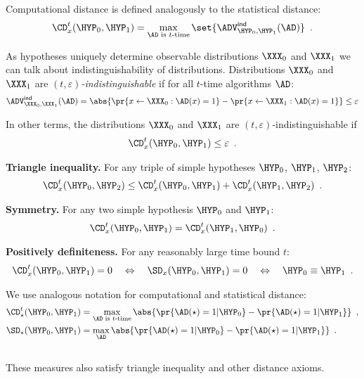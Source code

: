 \documentclass[landscape,footrule]{foils}
\begin{document}
Computational distance is defined analogously to the statistical distance:
\begin{align*}
  \CD_x^t(\HYP_0,\HYP_1)=\max_{\AD \text{ is $t$-time}} \set{\smash{\advINDXX{\HYP_0,\HYP_1}{\AD}}}
  \enspace.
\end{align*}

As hypotheses uniquely determine observable distributions $\XXX_0$ and
$\XXX_1$ we can talk about indistinguishability of distributions.
Distributions $\XXX_0$ and $\XXX_1$ are
$(t,\varepsilon)$\emph{-indistinguishable} if for all $t$-time
algorithms $\AD$:
\begin{align*}
  \advINDXX{\XXX_0,\XXX_1}{\AD}=
  \abs{\pr{x\gets \XXX_0: \AD(x)=1}-\pr{x\gets \XXX_1: \AD(x)=1}}\leq\varepsilon
\end{align*}

In other terms, the distributions $\XXX_0$ and $\XXX_1$ are
$(t,\varepsilon)$-indistinguishable if 
\begin{align*}
\CD_x^t(\HYP_0,\HYP_1)\leq \varepsilon\enspace.  
\end{align*}


\textbf{Triangle inequality.}  For any triple of simple hypotheses
$\HYP_0$, $\HYP_1$, $\HYP_2$:
\begin{align*}
    \CD_x^t(\HYP_0,\HYP_2)\leq \CD_x^t(\HYP_0,\HYP_1) +
    \CD_x^t(\HYP_1,\HYP_2) \enspace.
\end{align*}
\bigskip

\textbf{Symmetry.} For any two simple hypothesis $\HYP_0$ and $\HYP_1$:
  \begin{align*}
      \CD_x^t(\HYP_0,\HYP_1)=\CD_x^t(\HYP_1,\HYP_0)\enspace.
  \end{align*}
\bigskip

\textbf{Positively definiteness.} For any reasonably large time bound $t$:
  \begin{align*}
       \CD_x^t(\HYP_0,\HYP_1)=0\quad\Leftrightarrow\quad \SD_x(\HYP_0,\HYP_1)=0
       \quad\Leftrightarrow\quad \HYP_0\equiv\HYP_1\enspace.
  \end{align*}



\enlargethispage{2cm}

%
We use analogous notation for computational and statistical distance:\vspace*{-1.5ex}
\begin{align*}
  \CD_\star^t(\HYP_0,\HYP_1)%
  &=\max_{\AD \text{ is
      $t$-time}}\abs{\pr{\AD(\star)=1|\HYP_0}-\pr{\AD(\star)=1|\HYP_1}}\enspace,\\
  \SD_\star(\HYP_0,\HYP_1)%
  &=\max_{\AD}\abs{\pr{\AD(\star)=1|\HYP_0}-\pr{\AD(\star)=1|\HYP_1}}\enspace.
\end{align*}\vspace*{-3.5ex}\\
These measures also satisfy triangle inequality and other distance axioms.
\end{document}
